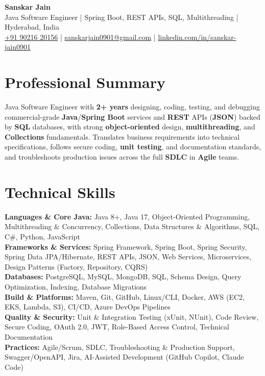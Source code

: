 \documentclass[a4paper,10pt]{article}
\begin{document}
\begin{center}
    {\LARGE \textbf{Sanskar Jain}} \\
    \vspace{2pt}
    Java Software Engineer \;|\; Spring Boot, REST APIs, SQL, Multithreading \;|\; Hyderabad, India \\
    \vspace{2pt}
    \href{tel:+919021620156}{+91 90216 20156} \;|\;
    \href{mailto:sanskarjain0901@gmail.com}{sanskarjain0901@gmail.com} \;|\;
    \href{https://www.linkedin.com/in/sanskar-jain0901/}{linkedin.com/in/sanskar-jain0901}
\end{center}

\section*{Professional Summary}
Java Software Engineer with \textbf{2+ years} designing, coding, testing, and debugging commercial-grade \textbf{Java}/\textbf{Spring Boot} services and \textbf{REST} APIs (\textbf{JSON}) backed by \textbf{SQL} databases, with strong \textbf{object-oriented} design, \textbf{multithreading}, and \textbf{Collections} fundamentals.
Translates business requirements into technical specifications, follows secure coding, \textbf{unit testing}, and documentation standards, and troubleshoots production issues across the full \textbf{SDLC} in \textbf{Agile} teams.

\section*{Technical Skills}
\begin{sloppypar}
\noindent
\textbf{Languages \& Core Java:} Java 8+, Java 17, Object-Oriented Programming, Multithreading \& Concurrency, Collections, Data Structures \& Algorithms, SQL, C\#, Python, JavaScript \\
\textbf{Frameworks \& Services:} Spring Framework, Spring Boot, Spring Security, Spring Data JPA/Hibernate, REST APIs, JSON, Web Services, Microservices, Design Patterns (Factory, Repository, CQRS) \\
\textbf{Databases:} PostgreSQL, MySQL, MongoDB, SQL, Schema Design, Query Optimization, Indexing, Database Migrations \\
\textbf{Build \& Platforms:} Maven, Git, GitHub, Linux/CLI, Docker, AWS (EC2, EKS, Lambda, S3), CI/CD, Azure DevOps Pipelines \\
\textbf{Quality \& Security:} Unit \& Integration Testing (xUnit, NUnit), Code Review, Secure Coding, OAuth 2.0, JWT, Role-Based Access Control, Technical Documentation \\
\textbf{Practices:} Agile/Scrum, SDLC, Troubleshooting \& Production Support, Swagger/OpenAPI, Jira, AI-Assisted Development (GitHub Copilot, Claude Code)
\end{sloppypar}
\end{document}
